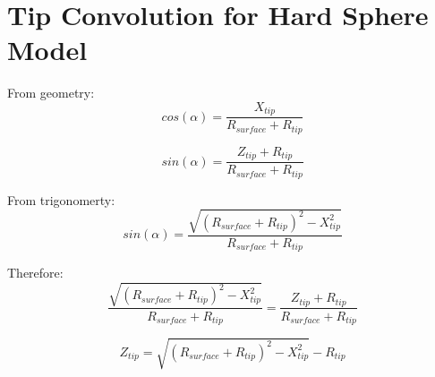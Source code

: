 \newpage 
\section{Tip Convolution for Hard Sphere Model \label{Appendix: Tip Convolution for Hard Sphere Model}}

From geometry:
\begin{equation}
cos(\alpha) = \frac{X_{tip}}{R_{surface}+R_{tip} }
\end{equation}

\begin{equation}
sin(\alpha) = \frac{Z_{tip}+R_{tip}}{R_{surface}+R_{tip}} \end{equation}


From trigonomerty:
\begin{equation}
sin(\alpha) = \frac{\sqrt{(R_{surface}+R_{tip})^2-X_{tip}^2}}{R_{surface}+R_{tip} }
\end{equation}

Therefore:
\begin{equation} \frac{\sqrt{(R_{surface}+R_{tip})^2-X_{tip}^2}}{R_{surface}+R_{tip}} = \frac{Z_{tip}+R_{tip}}{R_{surface}+R_{tip}} 
\end{equation}

\begin{equation}
Z_{tip} = \sqrt{(R_{surface}+R_{tip})^2-X_{tip}^2} - R_{tip}
\end{equation}


